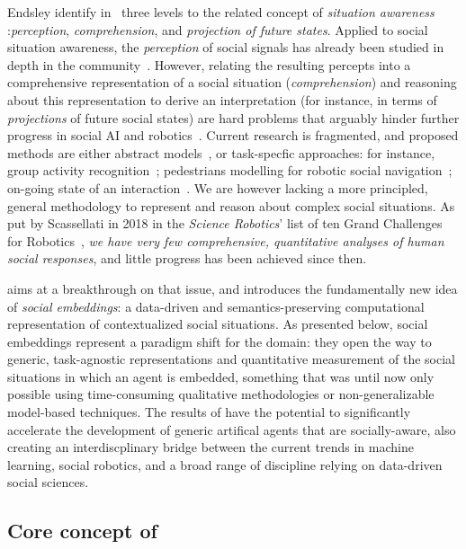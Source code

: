 
Endsley identify in~\cite{endsley1995theory} three levels to the related concept
of \textit{situation awareness} :\emph{perception}, \emph{comprehension}, and
\emph{projection of future states}. Applied to social situation awareness,
the \emph{perception} of social signals has already been studied in depth in the
community~\cite{pantic2011social,vinciarelli2009social}.  However, relating the
resulting percepts into a comprehensive representation of a social situation
(\emph{comprehension}) and reasoning about this representation to derive an
interpretation (for instance, in terms of \emph{projections} of future social
states) are hard problems that arguably hinder further progress in social AI and
robotics~\cite{yang2018grand}. Current research is fragmented, and proposed
methods are either abstract models~\cite{gordon2016commonsense}, or task-specfic
approaches: for instance, group activity
recognition~\cite{shu2017cern,wu2019learning}; pedestrians modelling for robotic
social navigation~\cite{alahi2016social}; on-going state of an
interaction~\cite{garcía2020explainable}. We are however lacking a more
principled, general methodology to represent and reason about complex social
situations. As put by Scassellati in 2018 in the \emph{Science Robotics}' list of
ten Grand Challenges for Robotics~\cite{yang2018grand}, \emph{we have very few
comprehensive, quantitative analyses of human social responses}, and little
progress has been achieved since then.

\project aims at a breakthrough on that issue, and introduces the fundamentally new
idea of \emph{social embeddings}: a data-driven and semantics-preserving
computational representation of contextualized social situations.  As presented
below, social embeddings represent a paradigm shift for the domain: they open
the way to generic, task-agnostic representations and quantitative measurement
of the social situations in which an agent is embedded, something that was until
now only possible using time-consuming qualitative methodologies or
non-generalizable model-based techniques.  The results of \project have the
potential to significantly accelerate the development of generic artifical
agents that are socially-aware, also creating an interdiscplinary bridge between
the current trends in machine learning, social robotics, and a broad range of discipline relying
on data-driven social sciences.

\subsection{Core concept of \project}

